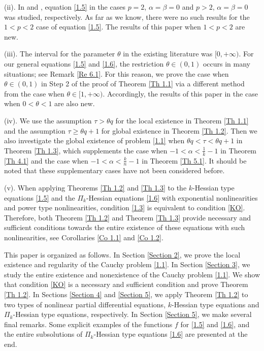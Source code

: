 \documentclass[a4paper,11pt]{amsart}
\theoremstyle{plain}
\theoremstyle{remark}
\numberwithin{equation}{section}
\numberwithin{figure}{section}
\numberwithin{remark}{section}
\begin{document}
\begin{sloppypar}
\vspace{1mm}

(ii). In \cite{JB2010} and \cite{BF2022}, equation \eqref{1.5} in the cases $p=2$, $\alpha=\beta=0$ and $p>2$, $\alpha=\beta=0$ was studied, respectively. As far as we know, there were no such results for the $1<p <2$ case of equation \eqref{1.5}. The results of this paper when $1<p<2$ are new.

\vspace{1mm}

(iii). The interval for the parameter $\theta$ in the existing literature was $[0, +\infty)$. For our general equations \eqref{1.5} and \eqref{1.6}, the restriction $\theta \in (0,1)$ occurs in many situations; see Remark \ref{Re 6.1}. For this reason, we prove the case when $\theta \in (0,1)$ in Step 2 of the proof of Theorem \ref{Th 1.1} via a different method from the case when $\theta \in [1, +\infty)$. Accordingly, the results of this paper in the case when $0<\theta <1$ are also new.

\vspace{1mm}

(iv). We use the assumption $\tau > \theta q$ for the local existence in Theorem \ref{Th 1.1} and the assumption $\tau \ge \theta q +1$ for global existence in Theorem \ref{Th 1.2}.  Then we also investigate the global existence of problem \eqref{1.1} when $\theta q<\tau < \theta q +1$ in Theorem \ref{Th 1.3}, which supplements the case when $-1<\alpha < \frac{1}{k} -1$ in Theorem \ref{Th 4.1} and the case when $-1< \alpha < \frac{k}{n}-1$ in Theorem \ref{Th 5.1}. It should be noted that these supplementary cases have not been considered before.

\vspace{1mm}

(v). When applying Theorems \ref{Th 1.2} and \ref{Th 1.3} to the $k$-Hessian type equations \eqref{1.5} and the $\Pi_k$-Hessian equations \eqref{1.6} with exponential nonlinearities and power type nonlinearities, condition \eqref{1.3} is equivalent to condition \eqref{KO}. Therefore, both Theorem  \ref{Th 1.2} and Theorem \ref{Th 1.3} provide necessary and sufficient conditions towards the entire existence of these equations with such nonlinearities, see Corollaries \ref{Co 1.1} and \ref{Co 1.2}.

\vspace{1mm}

This paper is organized as follows. In Section \ref{Section 2}, we prove the local existence and regularity of the Cauchy problem \eqref{1.1}. In Section \ref{Section 3},  we study the entire existence and nonexistence of the Cauchy problem \eqref{1.1}. We show that condition \eqref{KO} is a necessary and sufficient condition and prove Theorem \ref{Th 1.2}. In Sections \ref{Section 4} and \ref{Section 5}, we apply Theorem \ref{Th 1.2} to two types of nonlinear partial differential equations, $k$-Hessian type equations and $\Pi_k$-Hessian type equations, respectively.  In Section \ref{Section 5}, we make several final remarks. Some explicit examples of the functions $f$ for \eqref{1.5} and \eqref{1.6}, and the entire subsolutions of $\Pi_k$-Hessian type equations \eqref{1.6} are presented at the end.


\end{sloppypar}
\end{document}
